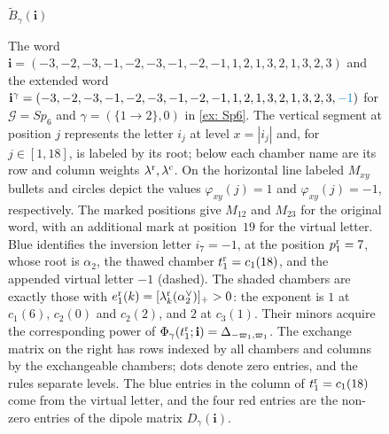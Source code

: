 \documentclass[a4paper]{amsart}
\numberwithin{equation}{section}
\theoremstyle{definition}
\theoremstyle{remark}
\newcommand{\mcG}{\mathcal{G}}
\newcommand{\bfi}{\mathbf{i}}
\newcommand{\rr}{{\rm r}}
\newcommand{\cc}{{\rm c}}
\begin{document}
\begin{example}
{\begin{landscape}
\begin{figure}[p]
{\begin{tikzpicture}[x=1.18cm,y=1.45cm]
\end{tikzpicture}%
}
\endgroup
    \par\medskip
    \begin{minipage}[c]{.63\linewidth}
    \setlength{\captionindent}{0pt}
    \setlength{\abovecaptionskip}{0pt}
    \caption[The BD word seed for the $Sp_6$ example]{%
      The word
      $\bfi=(-3,-2,-3,-1,-2,-3,-1,-2,-1,1,2,1,3,2,1,3,2,3)$
      and the extended word
      $\bfi^\gamma=(-3,-2,-3,-1,-2,-3,-1,-2,-1,1,2,1,3,2,1,3,2,3,\textcolor{accent}{-1})$
      for $\mcG=Sp_6$ and
      $\gamma=(\{1\to2\},0)$ in \cref{ex: Sp6}.
      The vertical segment at position $j$ represents the letter $i_j$ at level
      $x=|i_j|$ and, for $j\in[1,18]$, is labeled by its root; below each chamber name are its row
      and column weights $\lambda^\rr,\lambda^\cc$.
      On the horizontal line labeled $M_{xy}$
      bullets and circles depict the values $\varphi_{xy}(j)=1$ and
      $\varphi_{xy}(j)=-1$, respectively.
      The marked positions give $M_{12}$ and $M_{23}$ for the original word,
      with an additional mark at position~$19$ for the virtual letter.
      Blue identifies the inversion letter $i_7=-1$, at the position $p^\rr_1=7$, whose root is $\alpha_2$,
      the thawed chamber $t^\rr_1=c_1(18)$, and the appended virtual letter $-1$
      (dashed).
      The shaded chambers are exactly those with
      $e^\rr_1(k)=[\lambda^\rr_k(\alpha_2^\vee)]_+>0$:
      the exponent is $1$ at $c_1(6)$, $c_2(0)$ and $c_2(2)$, and $2$ at $c_3(1)$.
      Their minors acquire the corresponding power of
      $\Phi_\gamma(t^\rr_1;\bfi)=\Delta_{-\varpi_1,\varpi_1}$.
      The exchange matrix on the right has rows indexed by all chambers and
      columns by the exchangeable chambers; dots denote zero entries,
      and the rules separate levels.
      The blue entries in the column of $t^\rr_1=c_1(18)$ come from the virtual letter,
      and the four red entries are the non-zero entries of the dipole matrix
      $D_\gamma(\bfi)$.}
    \label{fig: Sp6 word seed}
    \end{minipage}\hfill
    \begin{minipage}[c]{.34\linewidth}
\begingroup
\centering
{\small $\widetilde B_\gamma(\mathbf i)$}\par\smallskip
\setlength{\arraycolsep}{1.5pt}
\renewcommand{\arraystretch}{.75}

\end{minipage}
\end{figure}
\end{landscape}}
\end{example}
\end{document}
